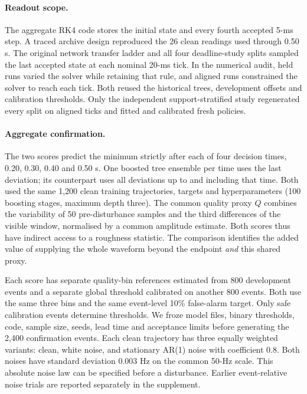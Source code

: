 \documentclass[10pt]{article}
\begin{document}
\paragraph{Readout scope.} The aggregate RK4 code stores the initial state and every fourth accepted 5-ms step. A traced archive design reproduced the 26 clean readings used through 0.50 s. The original network transfer ladder and all four deadline-study splits sampled the last accepted state at each nominal 20-ms tick. In the numerical audit, held runs varied the solver while retaining that rule, and aligned runs constrained the solver to reach each tick. Both reused the historical trees, development offsets and calibration thresholds. Only the independent support-stratified study regenerated every split on aligned ticks and fitted and calibrated fresh policies.

\paragraph{Aggregate confirmation.}
The two scores predict the minimum strictly after each of four decision times, 0.20, 0.30, 0.40 and 0.50 s. One boosted tree ensemble per time uses the last deviation; its counterpart uses all deviations up to and including that time. Both used the same 1,200 clean training trajectories, targets and hyperparameters (100 boosting stages, maximum depth three). The common quality proxy $Q$ combines the variability of 50 pre-disturbance samples and the third differences of the visible window, normalised by a common amplitude estimate. Both scores thus have indirect access to a roughness statistic. The comparison identifies the added value of supplying the whole waveform beyond the endpoint \emph{and} this shared proxy.

Each score has separate quality-bin references estimated from 800 development events and a separate global threshold calibrated on another 800 events. Both use the same three bins and the same event-level 10\% false-alarm target. Only safe calibration events determine thresholds. We froze model files, binary thresholds, code, sample size, seeds, lead time and acceptance limits before generating the 2,400 confirmation events. Each clean trajectory has three equally weighted variants: clean, white noise, and stationary AR(1) noise with coefficient 0.8. Both noises have standard deviation 0.003 Hz on the common 50-Hz scale. This absolute noise law can be specified before a disturbance. Earlier event-relative noise trials are reported separately in the supplement.
\end{document}
